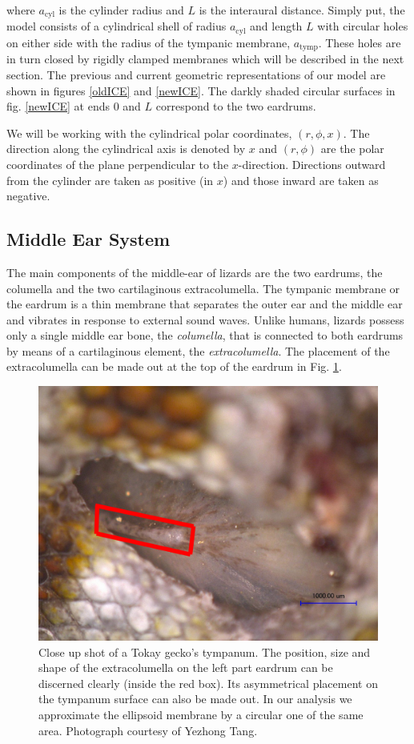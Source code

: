 where $a_{\mathrm{cyl}}$ is the cylinder radius and $L$ is the interaural distance. Simply put, the model consists of a cylindrical shell
of radius $a_{\mathrm{cyl}}$ and length $L$ with circular holes on either side with the radius of the tympanic membrane, $a_{\mathrm{tymp}}$. These
holes are in turn closed by rigidly clamped membranes which will be described in the next section. The previous and current geometric representations
of our model are shown in figures \ref{oldICE} and \ref{newICE}. The darkly shaded circular surfaces in fig. \ref{newICE} at ends $0$ and $L$ correspond to the two
eardrums.

We will be working with the cylindrical polar coordinates, $(r,\phi,x)$. The direction
along the cylindrical axis is denoted by $x$ and $(r,\phi)$ are the polar coordinates of the plane perpendicular to the $x$-direction. 
Directions outward from the cylinder are taken as positive (in $x$) and those inward are taken as negative.
\subsection{Middle Ear System}\label{middleear}
The main components of the middle-ear of lizards are the two eardrums, the columella and the two cartilaginous extracolumella.  
The tympanic membrane or the eardrum is a thin membrane that separates the outer ear and the
middle ear and vibrates in response to external sound waves.  Unlike humans, lizards 
possess only a single middle ear bone, the \textit{columella},
that is connected to both eardrums by means of a cartilaginous element, the \textit{extracolumella}. The
placement of the extracolumella can be made out at the top of the eardrum in Fig. \ref{geckoextracolumella}.
\begin{figure}[ht]
 \centering
 \includegraphics[width=.7\linewidth]{Diagrams/geckoextracolumella.png}
 \caption[Extracolumella position on a gecko' ear.]{Close up shot of a Tokay gecko's tympanum. The position, size
 and shape of the extracolumella on the left part eardrum can be discerned clearly (inside the red box). Its asymmetrical placement on the tympanum
 surface can also be made out. In our analysis we approximate the
 ellipsoid membrane by a circular one of the same area. Photograph courtesy of Yezhong Tang.}
 \label{geckoextracolumella}
\end{figure}


